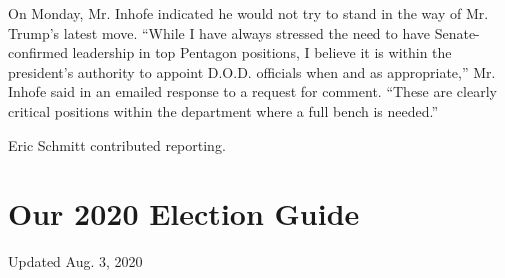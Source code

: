 On Monday, Mr. Inhofe indicated he would not try to stand in the way of
Mr. Trump's latest move. ``While I have always stressed the need to have
Senate-confirmed leadership in top Pentagon positions, I believe it is
within the president's authority to appoint D.O.D. officials when and as
appropriate,'' Mr. Inhofe said in an emailed response to a request for
comment. ``These are clearly critical positions within the department
where a full bench is needed.''

Eric Schmitt contributed reporting.

\hypertarget{our-2020-election-guide}{%
\section{Our 2020 Election Guide}\label{our-2020-election-guide}}

Updated Aug. 3, 2020

